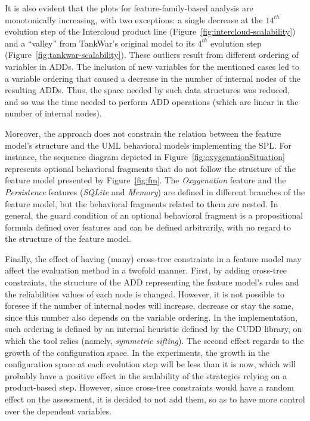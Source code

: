 It is also evident that the plots for feature-family-based analysis are monotonically
increasing, with two exceptions: a single decrease at the $14^{th}$ evolution
step of the Intercloud product line (Figure~\ref{fig:intercloud-scalability})
and a ``valley'' from TankWar's original model to its $4^{th}$ evolution step
(Figure~\ref{fig:tankwar-scalability}).  These outliers result from different
ordering of variables in ADDs.  The inclusion of new variables for the mentioned
cases led to a variable ordering that caused a decrease in the number of
internal nodes of the resulting ADDs.  Thus, the space needed by such data
structures was reduced, and so was the time needed to perform ADD operations
(which are linear in the number of internal nodes).

Moreover, the approach does not constrain the relation between the feature
model's structure and the UML behavioral models implementing the SPL.  For
instance, the sequence diagram depicted in Figure~\ref{fig:oxygenationSituation}
represents optional behavioral fragments that do not follow the structure of the
feature model presented by Figure~\ref{fig:fm}. The \emph{Oxygenation} feature
and the \emph{Persistence} features (\emph{SQLite} and \emph{Memory}) are
defined in different branches of the feature model, but the behavioral fragments
related to them are nested. In general, the guard condition of an optional
behavioral fragment is a propositional formula defined over features and can be
defined arbitrarily, with no regard to the structure of the feature model.

Finally, the effect of having (many) cross-tree constraints in a feature model
may affect the evaluation method in a twofold manner. First, by adding
cross-tree constraints, the structure of the ADD representing the feature
model's rules and the reliabilities values of each node is changed. However, it
is not possible to foresee if the number of internal nodes will increase,
decrease or stay the same, since this number also depends on the variable
ordering. In the implementation, such ordering is defined by an internal
heuristic defined by the CUDD library, on which the tool relies (namely,
\emph{symmetric sifting}). The second effect regards to the growth of the configuration
space. In the experiments, the growth in the configuration space at each
evolution step will be less than it is now, which will probably have a positive
effect in the scalability of the strategies relying on a product-based step.
However, since cross-tree constraints would have a random effect on the
assessment, it is decided to not add them, so as to have more control over the
dependent variables. 


